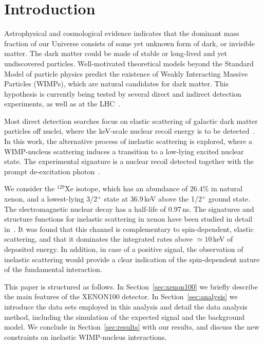 \section{\label{sec:intro} Introduction}

Astrophysical and cosmological evidence indicates that the dominant mass fraction of our Universe consists of some yet unknown
form of dark, or invisible matter. The dark matter could be made of stable or long-lived and yet undiscovered particles. Well-motivated
theoretical models beyond the Standard Model of particle physics predict the existence of Weakly Interacting Massive
Particles (WIMPs), which are natural candidates for dark matter. This hypothesis is currently being tested by several direct
and indirect detection experiments, as well as at the LHC~\cite{Bertone:2010zza,Baudis:2016qwx}.

Most direct detection searches focus on elastic scattering of galactic dark matter particles off nuclei, where the keV-scale 
nuclear recoil energy is to be detected~\cite{Undagoitia:2015gya,Baudis:2015mpa}. In this work, the 
alternative process of inelastic scattering is explored, where a WIMP-nucleus scattering induces a transition to a low-lying 
excited nuclear state. The experimental signature is a nuclear recoil detected together with the prompt de-excitation 
photon~\cite{Ellis:1988nb}. 

We consider the $^{129}\text{Xe}$ isotope, which has an abundance of 26.4\% in natural xenon, and a lowest-lying 
3/2$^{+}$ state at 36.9\,keV above the 1/2$^+$ ground state. The electromagnetic nuclear decay has a half-life of 0.97\,ns. 
The signatures and structure functions for inelastic scattering in xenon have been studied in detail in~\cite{Baudis:2013bba}. It was found that this channel is complementary to spin-dependent, elastic scattering, and that it dominates the integrated rates above $\simeq10$\,keV of deposited energy. 
In addition, in case of a positive signal, the observation of inelastic scattering would provide a clear 
indication of the spin-dependent nature of the fundamental interaction. 

This paper is structured as follows.  In Section~\ref{sec:xenon100} we briefly describe the main features of the XENON100 detector.  In Section~\ref{sec:analysis} we introduce the data 
sets employed in this analysis and detail the data analysis method, including the simulation of the expected signal and the 
background model. We conclude in Section~\ref{sec:results} with our results, and discuss the new constraints on inelastic WIMP-nucleus interactions.

